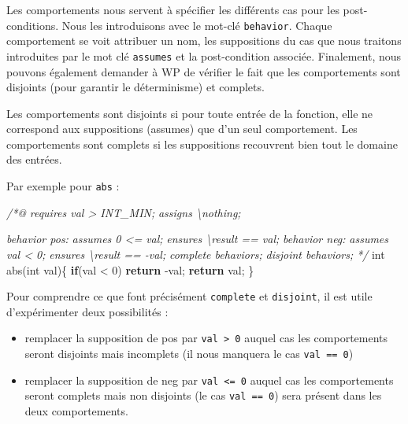 \documentclass[12pt,francais,]{scrbook}
\newenvironment{Shaded}{}{}
\newcommand{\KeywordTok}[1]{\textcolor[rgb]{0.00,0.44,0.13}{\textbf{{#1}}}}
\newcommand{\DataTypeTok}[1]{\textcolor[rgb]{0.56,0.13,0.00}{{#1}}}
\newcommand{\DecValTok}[1]{\textcolor[rgb]{0.25,0.63,0.44}{{#1}}}
\newcommand{\CommentTok}[1]{\textcolor[rgb]{0.38,0.63,0.69}{\textit{{#1}}}}
\newcommand{\NormalTok}[1]{{#1}}
\providecommand{\tightlist}{%
  \setlength{\itemsep}{0pt}\setlength{\parskip}{0pt}}
\begin{document}
Les comportements nous servent à spécifier les différents cas pour les
post-conditions. Nous les introduisons avec le mot-clé
\texttt{behavior}. Chaque comportement se voit attribuer un nom, les
suppositions du cas que nous traitons introduites par le mot clé
\texttt{assumes} et la post-condition associée. Finalement, nous pouvons
également demander à WP de vérifier le fait que les comportements sont
disjoints (pour garantir le déterminisme) et complets.

Les comportements sont disjoints si pour toute entrée de la fonction,
elle ne correspond aux suppositions (assumes) que d'un seul
comportement. Les comportements sont complets si les suppositions
recouvrent bien tout le domaine des entrées.

Par exemple pour \texttt{abs} :

\begin{footnotesize}\begin{Shaded}
\begin{Highlighting}[]
\CommentTok{/*@}
\CommentTok{  requires val > INT_MIN;}
\CommentTok{  assigns  \textbackslash{}nothing;}

\CommentTok{  behavior pos:}
\CommentTok{    assumes 0 <= val;}
\CommentTok{    ensures \textbackslash{}result == val;}
\CommentTok{  }
\CommentTok{  behavior neg:}
\CommentTok{    assumes val < 0;}
\CommentTok{    ensures \textbackslash{}result == -val;}
\CommentTok{ }
\CommentTok{  complete behaviors;}
\CommentTok{  disjoint behaviors;}
\CommentTok{*/}
\DataTypeTok{int} \NormalTok{abs(}\DataTypeTok{int} \NormalTok{val)\{}
  \KeywordTok{if}\NormalTok{(val < }\DecValTok{0}\NormalTok{) }\KeywordTok{return} \NormalTok{-val;}
  \KeywordTok{return} \NormalTok{val;}
\NormalTok{\}}
\end{Highlighting}
\end{Shaded}\end{footnotesize}

Pour comprendre ce que font précisément \texttt{complete} et
\texttt{disjoint}, il est utile d'expérimenter deux possibilités :

\begin{itemize}
\tightlist
\item
  remplacer la supposition de \og{}pos\fg{} par
  \texttt{val\ \textgreater{}\ 0} auquel cas les comportements seront
  disjoints mais incomplets (il nous manquera le cas
  \texttt{val\ ==\ 0})
\item
  remplacer la supposition de \og{}neg\fg{} par \texttt{val\ \textless{}=\ 0}
  auquel cas les comportements seront complets mais non disjoints (le
  cas \texttt{val\ ==\ 0}) sera présent dans les deux comportements.
\end{itemize}
\end{document}
